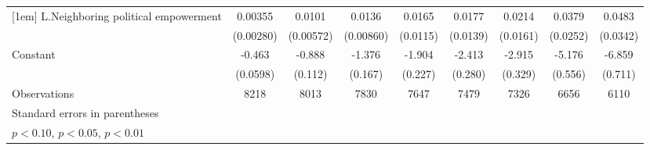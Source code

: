 \begin{table}[htbp]
\begin{tabular}{l*{8}{c}}
[1em]
L.Neighboring political empowerment&     0.00355         &      0.0101\sym{*}  &      0.0136         &      0.0165         &      0.0177         &      0.0214         &      0.0379         &      0.0483         \\
                    &   (0.00280)         &   (0.00572)         &   (0.00860)         &    (0.0115)         &    (0.0139)         &    (0.0161)         &    (0.0252)         &    (0.0342)         \\
[1em]
Constant            &      -0.463\sym{***}&      -0.888\sym{***}&      -1.376\sym{***}&      -1.904\sym{***}&      -2.413\sym{***}&      -2.915\sym{***}&      -5.176\sym{***}&      -6.859\sym{***}\\
                    &    (0.0598)         &     (0.112)         &     (0.167)         &     (0.227)         &     (0.280)         &     (0.329)         &     (0.556)         &     (0.711)         \\
\hline
Observations        &        8218         &        8013         &        7830         &        7647         &        7479         &        7326         &        6656         &        6110         \\
\hline\hline
\multicolumn{9}{l}{\footnotesize Standard errors in parentheses}\\
\multicolumn{9}{l}{\footnotesize \sym{*} \(p<0.10\), \sym{**} \(p<0.05\), \sym{***} \(p<0.01\)}\\
\end{tabular}
\end{table}
